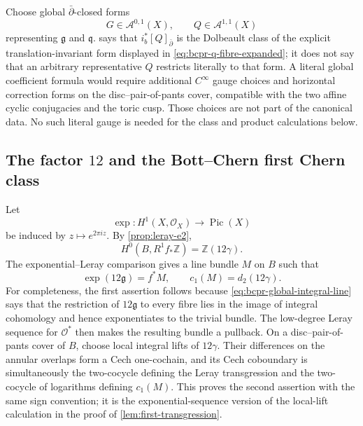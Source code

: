 \begin{remark}
\label{rem:bcpr-literal-gauge}
Choose global $\bar\partial$-closed forms
\begin{equation}
 G\in\mathcal A^{0,1}(X),\qquad
 Q\in\mathcal A^{1,1}(X)
\label{eq:bcpr-global-representatives}
\end{equation}
representing $\mathfrak g$ and $\mathfrak q$.
 says that
$i_b^*[Q]_{\bar\partial}$ is the Dolbeault class of the explicit
translation-invariant
form displayed in \cref{eq:bcpr-q-fibre-expanded}; it does not say that an arbitrary
representative $Q$ restricts literally to that form.  A literal global
coefficient formula would require additional $C^\infty$ gauge choices and
horizontal correction forms on the disc--pair-of-pants cover, compatible
with the two affine cyclic conjugacies and the toric cusp.  Those choices
are not part of the canonical data.  No such literal gauge is needed for
the class and product calculations below.
\end{remark}

\subsection{The factor \texorpdfstring{$12$}{12} and the Bott--Chern first Chern class}

Let
\[
 \exp\colon H^1(X,\mathcal O_X)\longrightarrow\operatorname{Pic}(X)
\]
be induced by $z\mapsto e^{2\pi iz}$.  By
\cref{prop:leray-e2},
\begin{equation}
 H^0(B,R^1f_*\mathbb Z)=\mathbb Z(12\gamma).
\label{eq:bcpr-global-integral-line}
\end{equation}
The exponential--Leray comparison gives a line bundle $M$ on $B$ such
that
\begin{equation}
 \exp(12\mathfrak g)=f^*M,
 \qquad c_1(M)=d_2(12\gamma).
\label{eq:bcpr-exponential-transgression}
\end{equation}
For completeness, the first assertion follows because
\cref{eq:bcpr-global-integral-line} says that the restriction of
$12\mathfrak g$ to every fibre lies in the image of integral cohomology
and hence exponentiates to the trivial bundle.  The low-degree Leray
sequence for $\mathcal O^*$ then makes the resulting bundle a pullback.
On a disc--pair-of-pants cover of $B$, choose local integral lifts of
$12\gamma$.  Their differences on the annular overlaps form a Cech
one-cochain, and its Cech coboundary is simultaneously the two-cocycle
defining the Leray transgression and the two-cocycle of logarithms defining
$c_1(M)$.  This proves the second assertion with the same sign convention;
it is the exponential-sequence version of the local-lift calculation in
the proof of \cref{lem:first-transgression}.

